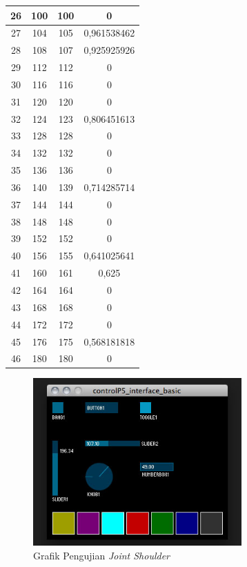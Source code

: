 \begin{table}[!htbp]
\begin{tabular}{|c|c|c|c|}
		26 & 100     & 100      & 0           \\ \hline
		27 & 104     & 105      & 0,961538462 \\ \hline
		28 & 108     & 107      & 0,925925926 \\ \hline
		29 & 112     & 112      & 0           \\ \hline
		30 & 116     & 116      & 0           \\ \hline
		31 & 120     & 120      & 0           \\ \hline
		32 & 124     & 123      & 0,806451613 \\ \hline
		33 & 128     & 128      & 0           \\ \hline
		34 & 132     & 132      & 0           \\ \hline
		35 & 136     & 136      & 0           \\ \hline
		36 & 140     & 139      & 0,714285714 \\ \hline
		37 & 144     & 144      & 0           \\ \hline
		38 & 148     & 148      & 0           \\ \hline
		39 & 152     & 152      & 0           \\ \hline
		40 & 156     & 155      & 0,641025641 \\ \hline
		41 & 160     & 161      & 0,625       \\ \hline
		42 & 164     & 164      & 0           \\ \hline
		43 & 168     & 168      & 0           \\ \hline
		44 & 172     & 172      & 0           \\ \hline
		45 & 176     & 175      & 0,568181818 \\ \hline
		46 & 180     & 180      & 0           \\ \hline
	\end{tabular}
\end{table} 
\begin{figure}[H]
	\centering
	\includegraphics[width=8cm]{gambar/controlp5.jpg}
	\caption{Grafik Pengujian \textit{Joint Shoulder}}
	\label{pic.jointshoulder}
\end{figure}

